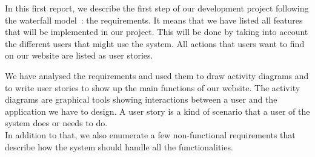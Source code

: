 

In this first report, we describe the first step of our development project following the waterfall model~: the requirements. It means that we have listed all features that will be implemented in our project. This will be done by taking into account the different users that might use the system. All actions that users want to find on our website are listed as user stories.

We have analysed the requirements and used them to draw activity diagrams and to write user stories to show up the main functions of our website. The activity diagrams are graphical tools showing interactions between a user and the application we have to design. A user story is a kind of scenario that a user of the system does or needs to do.\\

In addition to that, we also enumerate a few non-functional requirements that describe how the system should handle all the functionalities.